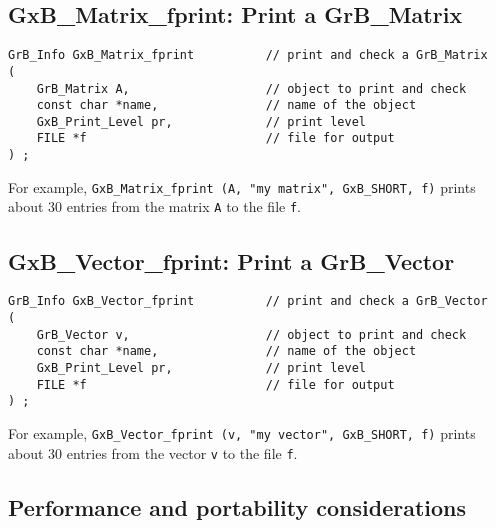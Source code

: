\documentclass[12pt]{article}
\begin{document}
\newpage
\subsection{{\sf GxB\_Matrix\_fprint:} Print a {\sf GrB\_Matrix}}

\begin{mdframed}[userdefinedwidth=6in]
{\footnotesize
\begin{verbatim}
GrB_Info GxB_Matrix_fprint          // print and check a GrB_Matrix
(
    GrB_Matrix A,                   // object to print and check
    const char *name,               // name of the object
    GxB_Print_Level pr,             // print level
    FILE *f                         // file for output
) ;
\end{verbatim} } \end{mdframed}

For example,
\verb'GxB_Matrix_fprint (A, "my matrix", GxB_SHORT, f)'
prints about 30 entries from the matrix \verb'A' to the file \verb'f'.


\subsection{{\sf GxB\_Vector\_fprint:} Print a {\sf GrB\_Vector}}

\begin{mdframed}[userdefinedwidth=6in]
{\footnotesize
\begin{verbatim}
GrB_Info GxB_Vector_fprint          // print and check a GrB_Vector
(
    GrB_Vector v,                   // object to print and check
    const char *name,               // name of the object
    GxB_Print_Level pr,             // print level
    FILE *f                         // file for output
) ;
\end{verbatim} } \end{mdframed}

For example,
\verb'GxB_Vector_fprint (v, "my vector", GxB_SHORT, f)'
prints about 30 entries from the vector \verb'v' to the file \verb'f'.

\subsection{Performance and portability considerations}
\end{document}

